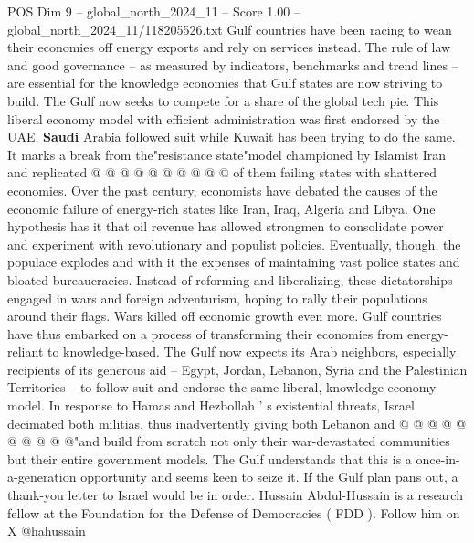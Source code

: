 \begin{textsample}{POS Dim 9 – global\_north\_2024\_11 – Score 1.00 – global\_north\_2024\_11/118205526.txt}
Gulf countries have been racing to wean their economies off energy exports and rely on services instead.
The rule of law and good governance -- as measured by indicators, benchmarks and trend lines -- are essential for the knowledge economies that Gulf states are now striving to build.
The Gulf now seeks to compete for a share of the global tech pie.
This liberal economy model with efficient administration was first endorsed by the UAE. \textbf{Saudi} Arabia followed suit while Kuwait has been trying to do the same.
It marks a break from the"resistance state"model championed by Islamist Iran and replicated @ @ @ @ @ @ @ @ @ @ of them failing states with shattered economies.
Over the past century, economists have debated the causes of the economic failure of energy-rich states like Iran, Iraq, Algeria and Libya.
One hypothesis has it that oil revenue has allowed strongmen to consolidate power and experiment with revolutionary and populist policies.
Eventually, though, the populace explodes and with it the expenses of maintaining vast police states and bloated bureaucracies.
Instead of reforming and liberalizing, these dictatorships engaged in wars and foreign adventurism, hoping to rally their populations around their flags.
Wars killed off economic growth even more.
Gulf countries have thus embarked on a process of transforming their economies from energy-reliant to knowledge-based.
The Gulf now expects its Arab neighbors, especially recipients of its generous aid -- Egypt, Jordan, Lebanon, Syria and the Palestinian Territories -- to follow suit and endorse the same liberal, knowledge economy model.
In response to Hamas and Hezbollah ' s existential threats, Israel decimated both militias, thus inadvertently giving both Lebanon and @ @ @ @ @ @ @ @ @ @"and build from scratch not only their war-devastated communities but their entire government models.
The Gulf understands that this is a once-in-a-generation opportunity and seems keen to seize it.
If the Gulf plan pans out, a thank-you letter to Israel would be in order.
Hussain Abdul-Hussain is a research fellow at the Foundation for the Defense of Democracies ( FDD ).
Follow him on X @hahussain

\end{textsample}
